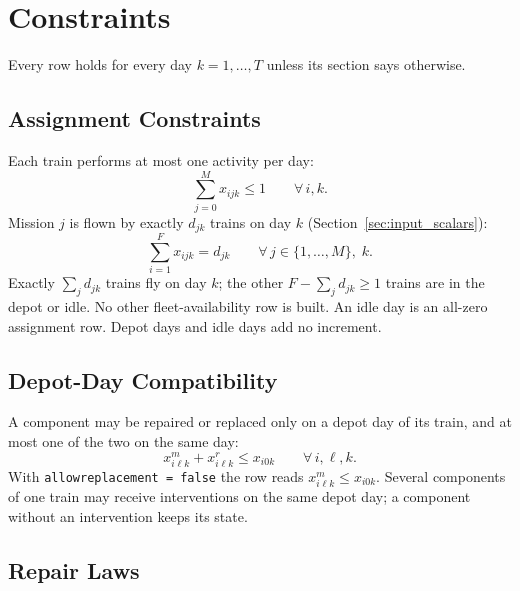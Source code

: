 \documentclass[11pt,a4paper]{article}
\theoremstyle{plain}
\theoremstyle{definition}
\renewcommand{\_}{\textunderscore\allowbreak{}}
\begin{document}
\section{Constraints}
\label{sec:constraints}

Every row holds for every day $k = 1, \ldots, T$ unless its section says otherwise.

\subsection{Assignment Constraints}
\label{sec:assignment}

Each train performs at most one activity per day:
\begin{equation}
  \sum_{j=0}^{M} x_{ijk} \leq 1 \qquad \forall\, i, k .
  \label{eq:a_one_activity}
\end{equation}
Mission $j$ is flown by exactly $d_{jk}$ trains on day $k$ (Section~\ref{sec:input_scalars}):
\begin{equation}
  \sum_{i=1}^{F} x_{ijk} = d_{jk} \qquad \forall\, j \in \{1, \ldots, M\},\; k .
  \label{eq:a_coverage}
\end{equation}
Exactly $\sum_{j} d_{jk}$ trains fly on day $k$; the other $F - \sum_{j} d_{jk} \ge 1$ trains are in the depot or idle.
No other fleet-availability row is built. An idle day is an all-zero assignment row.
Depot days and idle days add no increment.

\subsection{Depot-Day Compatibility}
\label{sec:depot}

A component may be repaired or replaced only on a depot day of its train, and at most
one of the two on the same day:
\begin{equation}
  x^m_{i\ell k} + x^r_{i\ell k} \leq x_{i0k} \qquad \forall\, i, \ell, k .
  \label{eq:a_depot}
\end{equation}
With \texttt{allow\_replacement = false} the row reads $x^m_{i\ell k} \leq x_{i0k}$.
Several components of one train may receive interventions on the same depot day; a
component without an intervention keeps its state.

\subsection{Repair Laws}
\label{sec:repair_laws}
\end{document}
